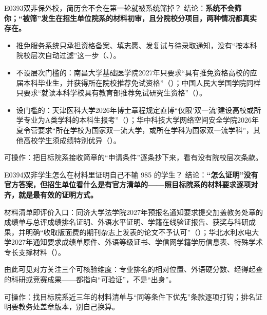 \begin{qa}{E0393}{双非保外校，简历会不会在第一轮就被系统筛掉？}
结论：\textbf{系统不会筛你；“被筛”发生在招生单位院系的材料初审，且分院校分项目，两种情况都真实存在。}

\begin{itemize}
  \item 推免服务系统只承担资格备案、填志愿、发复试与待录取通知，没有“按本科院校层次自动过滤”这一步（、）。
  \item 不设层次门槛的：南昌大学基础医学院2027年只要求“具有推免资格高校的应届本科毕业生，并获得所在院校推荐免试资格”（）；中国人民大学国学院同样只要求“就读本科学校具有教育部推荐免试研究生资格”（）。
  \item 设门槛的：天津医科大学2026年博士章程规定直博“仅限'双一流'建设高校或所学专业为A类学科的本科生报考”（）；华中科技大学网络空间安全学院2026年夏令营要求“所在学校为国家双一流大学，或所在学科为国家双一流学科”，其他高校学生须成绩特别优异（）。
\end{itemize}

可操作：把目标院系接收简章的“申请条件”逐条抄下来，看有没有院校层次条款。
\end{qa}

\begin{qa}{E0394}{双非学生怎么在材料里证明自己不输 985 的学生？}
结论：\textbf{“怎么证明”没有官方答案，但招生单位看什么是有官方清单的——照目标院系的材料要求逐项对齐，就是最有效的证明方式。}

材料清单即评价入口：同济大学法学院2027年预报名通知要求提交加盖教务处章的成绩单与总评成绩排名证明、外语水平证明、学籍在线验证报告、获奖与科研成果，并明确“收取版面费的期刊杂志上发表的论文不予认可”（）；华北水利水电大学2027年通知要求成绩单原件、外语等级证书、学信网学籍学历信息表、特殊学术专长支撑材料（）。

由此可见对方关注三个可核验维度：专业排名的相对位置、外语硬分数、经得起查的科研或竞赛成果——都指向“可验证”，不是“出身”。

可操作：找目标院系近三年的材料清单与“同等条件下优先”条款逐项打钩；排名证明要教务处盖章版本，别自己换算。
\end{qa}

